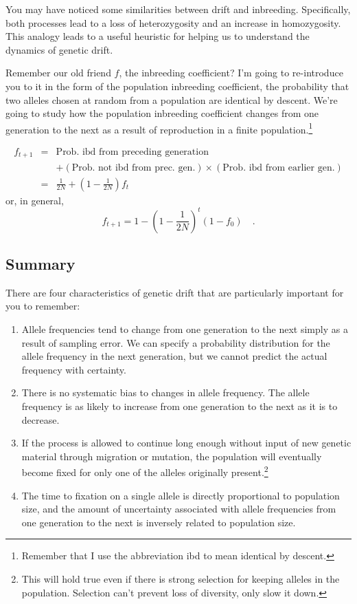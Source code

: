 You may have noticed some similarities between drift and
inbreeding. Specifically, both processes lead to a loss of
heterozygosity and an increase in homozygosity. This analogy leads to
a useful heuristic for helping us to understand the dynamics of
genetic drift.

Remember our old friend $f$, the inbreeding coefficient? I'm going to
re-introduce you to it in the form of the population inbreeding
coefficient, the probability that two alleles chosen at random from a
population are identical by descent. We're going to study how the
population inbreeding coefficient changes from one generation to the
next as a result of reproduction in a finite
population.\footnote{Remember that I use the abbreviation ibd to mean
identical by descent.}

\begin{eqnarray*}
f_{t+1} &=& \mbox{Prob. ibd from preceding generation} \\
        &&  + (\mbox{Prob. not ibd from prec. gen.}) \times (\mbox{Prob. ibd from
          earlier gen.}) \\
   &=& \frac{1}{2N} + \left(1 - \frac{1}{2N}\right)f_t
\end{eqnarray*}
or, in general,
\[
f_{t+1} = 1 - \left(1 - \frac{1}{2N}\right)^t(1-f_0) \quad .
\]

\subsection*{Summary}

There are four characteristics of genetic drift that are particularly
important for you to remember:

\begin{enumerate}

\item Allele frequencies tend to change from one generation to the
next simply as a result of sampling error. We can specify a
probability distribution for the allele frequency in the next
generation, but we cannot predict the actual frequency with certainty.

\item There is no systematic bias to changes in allele frequency. The
allele frequency is as likely to increase from one generation to the
next as it is to decrease.

\item If the process is allowed to continue long enough without input
of new genetic material through migration or mutation, the population
will eventually become fixed for only one of the alleles originally
present.\footnote{This will hold true even if there is strong
selection for keeping alleles in the population. Selection can't
prevent loss of diversity, only slow it down.}

\item The time to fixation on a single allele is directly proportional
to population size, and the amount of uncertainty associated with
allele frequencies from one generation to the next is inversely
related to population size.

\end{enumerate}

